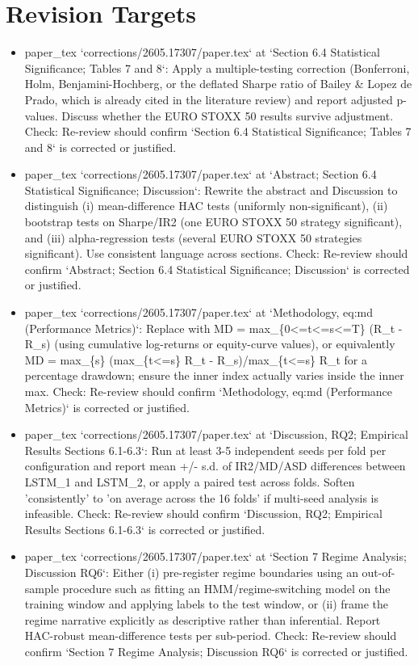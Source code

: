\documentclass[11pt]{article}
\begin{document}
\section*{Revision Targets}
\begin{itemize}[leftmargin=*]
  \item [open] paper\_tex `corrections/2605.17307/paper.tex` at `Section 6.4 Statistical Significance; Tables 7 and 8`: Apply a multiple-testing correction (Bonferroni, Holm, Benjamini-Hochberg, or the deflated Sharpe ratio of Bailey \& Lopez de Prado, which is already cited in the literature review) and report adjusted p-values. Discuss whether the EURO STOXX 50 results survive adjustment. Check: Re-review should confirm `Section 6.4 Statistical Significance; Tables 7 and 8` is corrected or justified.
  \item [open] paper\_tex `corrections/2605.17307/paper.tex` at `Abstract; Section 6.4 Statistical Significance; Discussion`: Rewrite the abstract and Discussion to distinguish (i) mean-difference HAC tests (uniformly non-significant), (ii) bootstrap tests on Sharpe/IR2 (one EURO STOXX 50 strategy significant), and (iii) alpha-regression tests (several EURO STOXX 50 strategies significant). Use consistent language across sections. Check: Re-review should confirm `Abstract; Section 6.4 Statistical Significance; Discussion` is corrected or justified.
  \item [open] paper\_tex `corrections/2605.17307/paper.tex` at `Methodology, eq:md (Performance Metrics)`: Replace with MD = max\_\{0<=t<=s<=T\} (R\_t - R\_s) (using cumulative log-returns or equity-curve values), or equivalently MD = max\_\{s\} (max\_\{t<=s\} R\_t - R\_s)/max\_\{t<=s\} R\_t for a percentage drawdown; ensure the inner index actually varies inside the inner max. Check: Re-review should confirm `Methodology, eq:md (Performance Metrics)` is corrected or justified.
  \item [open] paper\_tex `corrections/2605.17307/paper.tex` at `Discussion, RQ2; Empirical Results Sections 6.1-6.3`: Run at least 3-5 independent seeds per fold per configuration and report mean +/- s.d. of IR2/MD/ASD differences between LSTM\_1 and LSTM\_2, or apply a paired test across folds. Soften 'consistently' to 'on average across the 16 folds' if multi-seed analysis is infeasible. Check: Re-review should confirm `Discussion, RQ2; Empirical Results Sections 6.1-6.3` is corrected or justified.
  \item [open] paper\_tex `corrections/2605.17307/paper.tex` at `Section 7 Regime Analysis; Discussion RQ6`: Either (i) pre-register regime boundaries using an out-of-sample procedure such as fitting an HMM/regime-switching model on the training window and applying labels to the test window, or (ii) frame the regime narrative explicitly as descriptive rather than inferential. Report HAC-robust mean-difference tests per sub-period. Check: Re-review should confirm `Section 7 Regime Analysis; Discussion RQ6` is corrected or justified.

\end{itemize}
\end{document}
